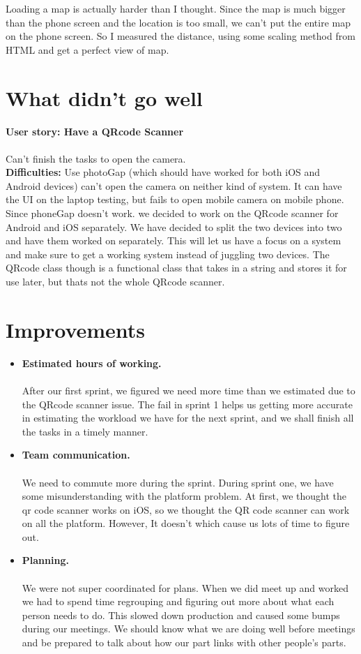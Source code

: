 \documentclass[12pt]{article}
\begin{document}
Loading a map is actually harder than I thought. Since the map is much bigger than the phone screen and the location is too small, we can’t put the entire map on the phone screen. So I measured the distance, using some scaling method from HTML and get a perfect view of map. \\



\section{What didn't go well}


\textbf{User story: Have a QR­code Scanner} \\ \\
Can't finish the tasks to open the camera.  \\

\textbf{Difficulties: } Use photoGap (which should have worked for both iOS and Android devices) can’t open the camera on neither kind of system. It can have the UI on the laptop testing, but fails to open mobile camera on mobile phone. Since phoneGap doesn’t work. we decided to work on the QRcode scanner for Android and iOS separately.  We have decided to split the two devices into two and have them worked on separately. This will let us have a focus on a system and make sure to get a working system instead of juggling two devices. The QRcode class though is a functional class that takes in a string and stores it for use later, but thats not the whole QRcode scanner.

\section{Improvements}
\begin{itemize}
\item \textbf{Estimated hours of working.} \\ \\
After our first sprint, we figured we need more time than we estimated due to the QRcode scanner issue. The fail in sprint 1 helps us getting more accurate in estimating the workload we have for the next sprint, and we shall finish all the tasks in a timely manner.

\item \textbf{Team communication.} \\ \\
We need to commute more during the sprint. During sprint one, we have some misunderstanding with the platform problem. At first, we thought the qr code scanner works
on iOS, so we thought the QR code scanner can work on all the platform. However, It doesn't which cause us lots of time to figure out.

\item \textbf{Planning.} \\ \\
We were not super coordinated for plans. When we did meet up and worked we had to spend time regrouping and figuring out more about what each person needs to do. This slowed down production and caused some bumps during our meetings. We should know what we are doing well before meetings and be prepared to talk about how our part links with other people’s parts.
\end{itemize}
\end{document}
